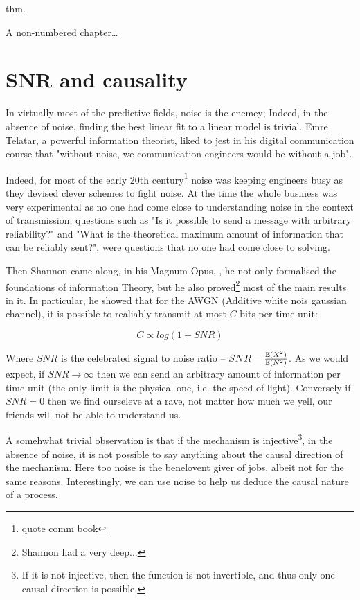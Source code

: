  thm.


A non-numbered chapter\dots

\section{SNR and causality}

In virtually most of the predictive fields, noise is the enemey; Indeed, in the absence of noise, finding the
best linear fit to a linear model is trivial. Emre Telatar, a powerful information theorist, liked to jest
in his digital communication course that "without noise, we communication engineers would be without a job".

Indeed, for most of the early 20th century\footnote{quote comm book} noise was keeping engineers busy as they 
devised clever schemes to fight noise. At the time the whole business was very experimental as
no one had come close to understanding noise in the context of transmission; questions such 
as "Is it possible to send a message with arbitrary reliability?" and "What is the theoretical maximum amount
of information that can be reliably sent?", were questions that no one had come close to solving.

Then Shannon came along, in his Magnum Opus, \cite{shannon}, he not only formalised the foundations of information
Theory, but he also proved\footnote{Shannon had a very deep...} most of the main results in it. In particular, he
showed that for the AWGN (Additive white nois gaussian channel), it is possible to realiably transmit at most $C$
bits per time unit:

$$
C \propto log(1 + SNR)
$$

Where $SNR$ is the celebrated signal to noise ratio -- $SNR = \frac{\operatorname{\mathbb{E}}(X^2)}{\operatorname{\mathbb{E}}(N^2)}$. As we 
would expect, if $SNR \rightarrow \infty$ then we can send an arbitrary amount of information 
per time unit (the only limit is the physical one, i.e. the speed of light). Conversely if $SNR = 0$
then we find ourseleve at a rave, not matter how much we yell, our friends will not be able to 
understand us.

A somehwhat trivial observation is that if the mechanism is injective\footnote{If it is not injective, then the function is
not invertible, and thus only one causal direction is possible.}, in the absence of noise, it is 
not possible to say anything about the causal direction of the mechanism. Here too noise is the
benelovent giver of jobs, albeit not for the same reasons. Interestingly, we can use noise to 
help us deduce the causal nature of a process. 

